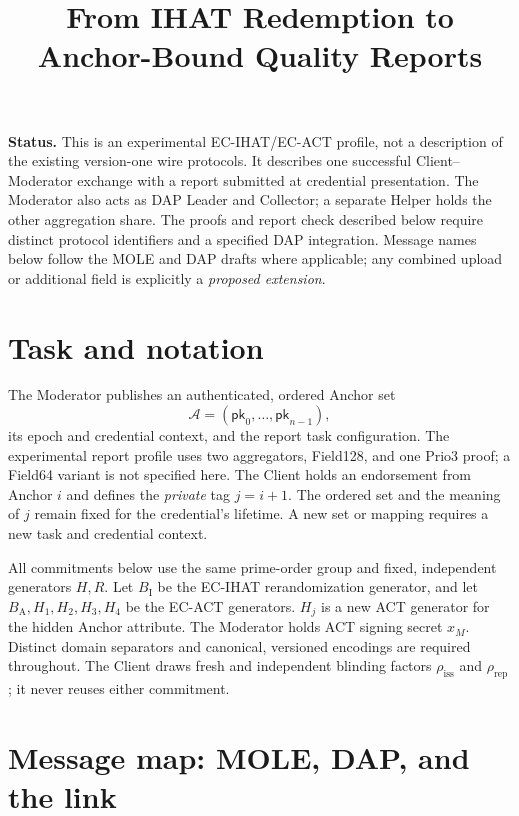 \documentclass[11pt]{article}
\title{From IHAT Redemption to Anchor-Bound Quality Reports}
\author{}
\date{}
\begin{document}
\maketitle

\noindent\textbf{Status.} This is an experimental EC-IHAT/EC-ACT profile,
not a description of the existing version-one wire protocols. It describes
one successful Client--Moderator exchange with a report submitted at credential
presentation. The Moderator also acts as DAP Leader and Collector; a separate
Helper holds the other aggregation share. The proofs and report check described
below require distinct protocol identifiers and a specified DAP integration.
Message names below follow the MOLE and DAP drafts where applicable; any
combined upload or additional field is explicitly a \emph{proposed extension}.

\section{Task and notation}

The Moderator publishes an authenticated, ordered Anchor set
\begin{equation*}
  \mathcal A=(\mathsf{pk}_0,\ldots,\mathsf{pk}_{n-1}),
\end{equation*}
its epoch and credential context, and the report task configuration. The
experimental report profile uses two aggregators, Field128, and one Prio3
proof; a Field64 variant is not specified here. The
Client holds an endorsement
from Anchor $i$ and defines the \emph{private} tag $j=i+1$. The ordered set
and the meaning of $j$ remain fixed for the credential's lifetime. A new
set or mapping requires a new task and credential context.

All commitments below use the same prime-order group and fixed, independent
generators $H,R$. Let $B_{\mathrm I}$ be the EC-IHAT rerandomization
generator, and let $B_{\mathrm A},H_1,H_2,H_3,H_4$ be the EC-ACT generators.
$H_j$ is a new ACT generator for the hidden Anchor attribute. The Moderator
holds ACT signing secret $x_M$. Distinct domain separators and canonical,
versioned encodings are required throughout. The Client draws fresh and
independent blinding factors $\rho_{\mathrm{iss}}$ and $\rho_{\mathrm{rep}}$;
it never reuses either commitment.

\section{Message map: MOLE, DAP, and the link}
\end{document}
